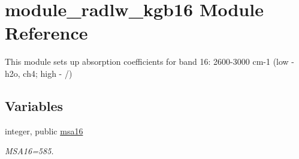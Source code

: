 \hypertarget{namespacemodule__radlw__kgb16}{}\section{module\+\_\+radlw\+\_\+kgb16 Module Reference}
\label{namespacemodule__radlw__kgb16}


This module sets up absorption coefficients for band 16\+: 2600-\/3000 cm-\/1 (low -\/ h2o, ch4; high -\/ /)  


\subsection*{Variables}
\begin{DoxyCompactItemize}
\item 
\mbox{\label{namespacemodule__radlw__kgb16_a95bf5395b579ca6619de3fc40c7ded79}} 
integer, public \hyperlink{namespacemodule__radlw__kgb16_a95bf5395b579ca6619de3fc40c7ded79}{msa16}
\begin{DoxyCompactList}\small\item\em M\+S\+A16=585. \end{DoxyCompactList}\end{DoxyCompactItemize}
